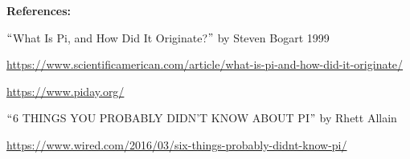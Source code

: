\documentclass[12pt]{article}
\begin{document}
\vspace{\baselineskip}

\vspace{\baselineskip}

\vspace{\baselineskip}

\vspace{\baselineskip}

\vspace{\baselineskip}

\vspace{\baselineskip}

\vspace{\baselineskip}

\vspace{\baselineskip}

\vspace{\baselineskip}
\begin{justify}
\textbf{References: }
\end{justify}\par

\setlength{\parskip}{0.0pt}
\begin{justify}
[1] $``$What Is Pi, and How Did It Originate?$"$  by Steven Bogart 1999
\end{justify}\par

\begin{justify}
\href{https://www.scientificamerican.com/article/what-is-pi-and-how-did-it-originate/}{https://www.scientificamerican.com/article/what-is-pi-and-how-did-it-originate/}
\end{justify}\par

\begin{justify}
[2] \href{https://www.piday.org/}{https://www.piday.org/}
\end{justify}\par

\begin{justify}
[3] $``$6 THINGS YOU PROBABLY DIDN'T KNOW ABOUT PI$"$  by Rhett Allain
\end{justify}\par

\begin{justify}
\href{https://www.wired.com/2016/03/six-things-probably-didnt-know-pi/}{https://www.wired.com/2016/03/six-things-probably-didnt-know-pi/}
\end{justify}\par
\end{document}
